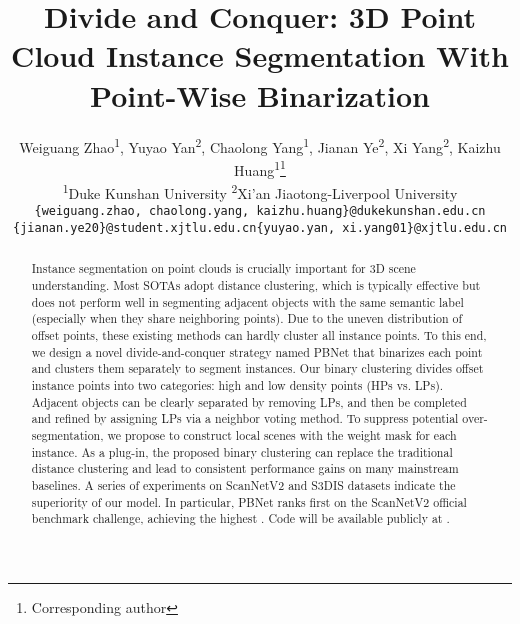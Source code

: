 \documentclass[10pt,twocolumn,letterpaper]{article}
\begin{document}
\title{Divide and  Conquer: 3D Point Cloud Instance Segmentation With Point-Wise Binarization}

\author{Weiguang Zhao\textsuperscript{1}, Yuyao Yan\textsuperscript{2}, Chaolong Yang\textsuperscript{1}, Jianan Ye\textsuperscript{2}, Xi Yang\textsuperscript{2}, Kaizhu Huang\textsuperscript{1}\thanks{Corresponding author}\\
\textsuperscript{1}Duke Kunshan University     \textsuperscript{2}Xi'an Jiaotong-Liverpool University\\
{\tt\small \{weiguang.zhao, chaolong.yang, kaizhu.huang\}@dukekunshan.edu.cn}\\
{\tt\small \{jianan.ye20\}@student.xjtlu.edu.cn\quad \{yuyao.yan, xi.yang01\}@xjtlu.edu.cn}
}

\maketitle
\ificcvfinal\thispagestyle{empty}\fi


\begin{abstract}
   Instance segmentation on point clouds is crucially important for 3D scene understanding.  Most SOTAs adopt distance clustering, which is typically effective but does not perform well in segmenting adjacent objects with the same semantic label (especially when they share neighboring points).  Due to the uneven distribution of offset points, these existing methods can hardly cluster all instance points.
   To this end, we design a novel divide-and-conquer strategy named PBNet that binarizes each point and clusters them separately to segment instances. Our binary clustering divides offset instance points into two categories: high and low density points (HPs vs. LPs). Adjacent objects can be clearly separated by removing LPs, and then be completed and refined by assigning LPs via a neighbor voting method. To suppress potential over-segmentation, we propose to construct local scenes with the weight mask for each instance. As a plug-in, the proposed binary clustering can replace the traditional distance clustering and lead to consistent performance gains on many mainstream baselines.  A series of  experiments on ScanNetV2 and S3DIS datasets indicate the superiority of our model. In particular, PBNet ranks first on the  ScanNetV2 official benchmark challenge, achieving the highest  . Code will be available publicly at \href{https://github.com/weiguangzhao/PBNet}{\tt\small{}}.
\end{abstract}
\end{document}
